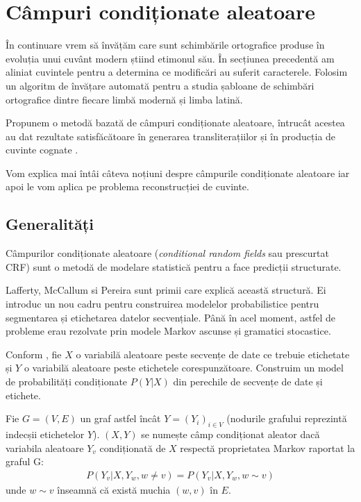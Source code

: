     
\section{Câmpuri condiționate aleatoare}
În continuare vrem să învățăm care sunt schimbările ortografice produse în evoluția unui cuvânt 
modern știind etimonul său. În secțiunea precedentă am aliniat cuvintele pentru a determina ce  
modificări au suferit caracterele. Folosim un algoritm de învățare automată pentru a studia
șabloane de schimbări ortografice dintre fiecare limbă modernă și limba latină.

Propunem o metodă bazată de câmpuri condiționate aleatoare, întrucât acestea au dat rezultate satisfăcătoare în generarea transliterațiilor \cite{ganesh} și în producția de cuvinte cognate \cite{crfciobanu}.

Vom explica mai întâi câteva noțiuni despre câmpurile condiționate aleatoare iar apoi le vom aplica 
pe problema reconstrucției de cuvinte.

\subsection{Generalități}
Câmpurilor condiționate aleatoare (\textit{conditional random fields} sau prescurtat CRF) sunt o
metodă de modelare statistică pentru a face predicții structurate.

Lafferty, McCallum si Pereira\cite{crf} sunt primii care explică această structură. Ei introduc un 
nou cadru pentru construirea modelelor probabilistice pentru segmentarea și etichetarea datelor
secvențiale. Până în acel moment, astfel de probleme erau rezolvate prin modele Markov ascunse și 
gramatici stocastice.

Conform \cite{crf}, fie $X$ o variabilă aleatoare peste secvențe de date ce trebuie etichetate și 
$Y$ o variabilă aleatoare peste etichetele corespunzătoare. Construim un model de probabilități
condiționate $P(Y|X)$ din perechile de secvențe de date și etichete.

\begin{definition}
Fie $G=(V, E)$ un graf astfel încât $Y=(Y_i)_{i \in V}$ (nodurile grafului reprezintă
indecșii etichetelor $Y$). $(X, Y)$ se numește câmp condiționat aleator dacă variabila aleatoare
$Y_v$ condiționată de $X$ respectă proprietatea Markov raportat la graful G: 
  \begin{gather*}
    P(Y_v | X, Y_w, w \neq v) = P(Y_v | X, Y_w, w \sim v)
  \end{gather*}
unde $w \sim v$ înseamnă că există muchia $(w, v)$ în $E$.
\end{definition}

